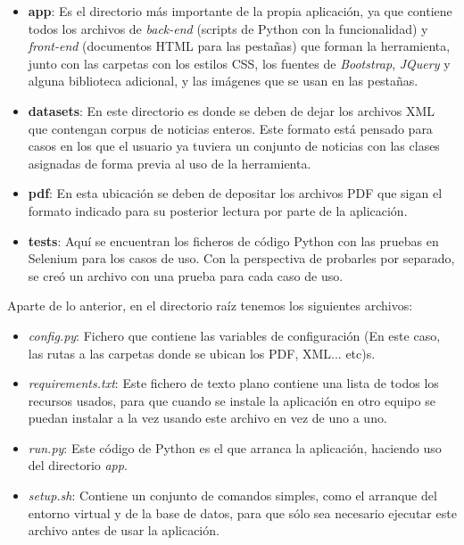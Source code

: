 \begin{itemize}

\item \textbf{app}: Es el directorio más importante de la propia aplicación, ya que contiene todos los archivos de \emph{back-end} (scripts de Python con la funcionalidad) y \emph{front-end} (documentos HTML para las pestañas) que forman la herramienta, junto con las carpetas con los estilos CSS, los fuentes de \emph{Bootstrap}, \emph{JQuery} y alguna biblioteca adicional, y las imágenes que se usan en las pestañas.

\item \textbf{datasets}: En este directorio es donde se deben de dejar los archivos XML que contengan corpus de noticias enteros. Este formato está pensado para casos en los que el usuario ya tuviera un conjunto de noticias con las clases asignadas de forma previa al uso de la herramienta.

\item \textbf{pdf}: En esta ubicación se deben de depositar los archivos PDF que sigan el formato indicado para su posterior lectura por parte de la aplicación.

\item \textbf{tests}: Aquí se encuentran los ficheros de código Python con las pruebas en Selenium para los casos de uso. Con la perspectiva de probarles por separado, se creó un archivo con una prueba para cada caso de uso.

\end{itemize}

Aparte de lo anterior, en el directorio raíz tenemos los siguientes archivos:

\begin{itemize}

\item \emph{config.py}: Fichero que contiene las variables de configuración (En este caso, las rutas a las carpetas donde se ubican los PDF, XML... etc)s.

\item \emph{requirements.txt}: Este fichero de texto plano contiene una lista de todos los recursos usados, para que cuando se instale la aplicación en otro equipo se puedan instalar a la vez usando este archivo en vez de uno a uno.

\item \emph{run.py}: Este código de Python es el que arranca la aplicación, haciendo uso del directorio \emph{app}.

\item \emph{setup.sh}: Contiene un conjunto de comandos simples, como el arranque del entorno virtual y de la base de datos, para que sólo sea necesario ejecutar este archivo antes de usar la aplicación.

\end{itemize}


